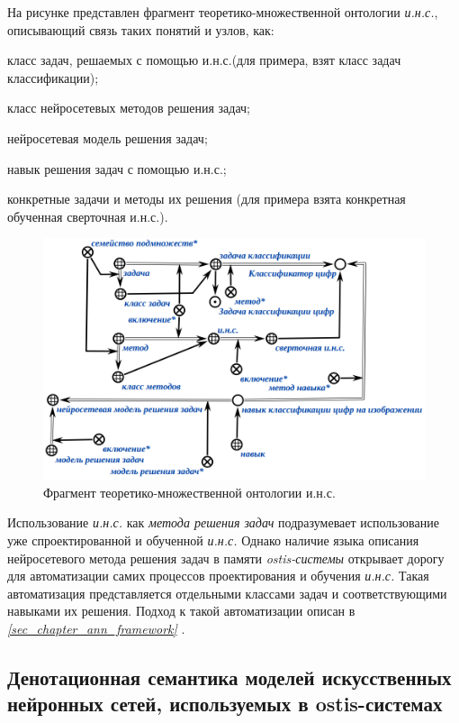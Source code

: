 На рисунке \textit{} представлен фрагмент теоретико-множественной онтологии \textit{и.н.с.}, описывающий связь таких понятий и узлов, как:
\begin{textitemize}
	\item класс задач, решаемых с помощью и.н.с.(для примера, взят класс задач классификации);
	\item класс нейросетевых методов решения задач;
	\item нейросетевая модель решения задач;
	\item навык решения задач с помощью и.н.с.;
	\item конкретные задачи и методы их решения (для примера взята конкретная обученная сверточная и.н.с.).
\end{textitemize}

\begin{figure}[H]
	\centering
	\includegraphics[scale=0.5]{author/part3/figures/actions_concepts.png}
	\caption{Фрагмент теоретико-множественной онтологии и.н.с.}
	\label{fig:actions_concepts}
\end{figure}

Использование \textit{и.н.с.} как\textit{ метода решения задач} подразумевает использование уже спроектированной и обученной \textit{и.н.с.} Однако наличие языка описания нейросетевого метода решения задач в памяти \textit{ostis-системы} открывает дорогу для автоматизации самих процессов проектирования и обучения \textit{и.н.с.} Такая автоматизация представляется отдельными классами задач и соответствующими навыками их решения. Подход к такой автоматизации описан в \textit{\ref{sec_chapter_ann_framework} }.

\subsection{Денотационная семантика моделей искусственных нейронных сетей, используемых в ostis-системах}

